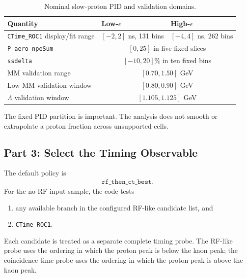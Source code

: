 \documentclass[11pt]{article}
\begin{document}
\begin{table}[htbp]
  \centering
  \caption{Nominal slow-proton PID and validation domains.}
  \label{tab:proton-pid-domains}
  \begin{tabular}{@{}lll@{}}
    \toprule
    Quantity & Low-$\epsilon$ & High-$\epsilon$ \\
    \midrule
    \texttt{CTime\_ROC1} display/fit range
      & $[-2,2]$ ns, 131 bins
      & $[-4,4]$ ns, 262 bins \\
    \texttt{P\_aero\_npeSum}
      & \multicolumn{2}{c}{$[0,25]$ in five fixed slices} \\
    \texttt{ssdelta}
      & \multicolumn{2}{c}{$[-10,20]\%$ in ten fixed bins} \\
    MM validation range
      & \multicolumn{2}{c}{$[0.70,1.50]$ GeV} \\
    Low-MM validation window
      & \multicolumn{2}{c}{$[0.80,0.90]$ GeV} \\
    $\Lambda$ validation window
      & \multicolumn{2}{c}{$[1.105,1.125]$ GeV} \\
    \bottomrule
  \end{tabular}
\end{table}

The fixed PID partition is important.  The analysis does not smooth or
extrapolate a proton fraction across unsupported cells.

\subsection{Part 3: Select the Timing Observable}

The default policy is
\begin{align}
  \texttt{rf\_then\_ct\_best}.
\end{align}
For the no-RF input sample, the code tests
\begin{enumerate}[leftmargin=2em]
  \item any available branch in the configured RF-like candidate list, and
  \item \texttt{CTime\_ROC1}.
\end{enumerate}
Each candidate is treated as a separate complete timing probe.  The RF-like
probe uses the ordering in which the proton peak is below the kaon peak; the
coincidence-time probe uses the ordering in which the proton peak is above the
kaon peak.
\end{document}
